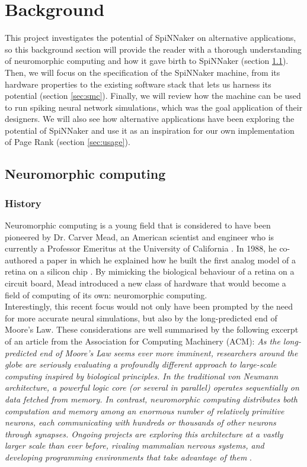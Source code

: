 \section{Background} \label{sec:bg}

This project investigates the potential of SpiNNaker on alternative applications, so this background section will provide the reader with a thorough understanding of neuromorphic computing and how it gave birth to SpiNNaker (section \ref{sec:nmc}). Then, we will focus on the specification of the SpiNNaker machine, from its hardware properties to the existing software stack that lets us harness its potential (section \ref{sec:smc}). Finally, we will review how the machine can be used to run spiking neural network simulations, which was the goal application of their designers. We will also see how alternative applications have been exploring the potential of SpiNNaker and use it as an inspiration for our own implementation of Page Rank (section \ref{sec:usage}).

\subsection{Neuromorphic computing} \label{sec:nmc}

\subsubsection{History}

Neuromorphic computing is a young field that is considered to have been pioneered by Dr. Carver Mead, an American scientist and engineer who is currently a Professor Emeritus at the University of California \cite{mead}. In 1988, he co-authored a paper in which he explained how he built the first analog model of a retina on a silicon chip \cite{retina}. By mimicking the biological behaviour of a retina on a circuit board, Mead introduced a new class of hardware that would become a field of computing of its own: neuromorphic computing. \\

Interestingly, this recent focus would not only have been prompted by the need for more accurate neural simulations, but also by the long-predicted end of Moore's Law. These considerations are well summarised by the following excerpt of an article from the Association for Computing Machinery (ACM): \textit{As the long-predicted end of Moore's Law seems ever more imminent, researchers around the globe are seriously evaluating a profoundly different approach to large-scale computing inspired by biological principles. In the traditional von Neumann architecture, a powerful logic core (or several in parallel) operates sequentially on data fetched from memory. In contrast, \textit{neuromorphic} computing distributes both computation and memory among an enormous number of relatively primitive \textit{neurons}, each communicating with hundreds or thousands of other neurons through \textit{synapses}. Ongoing projects are exploring this architecture at a vastly larger scale than ever before, rivaling mammalian nervous systems, and developing programming environments that take advantage of them} \cite{acm}. \\

